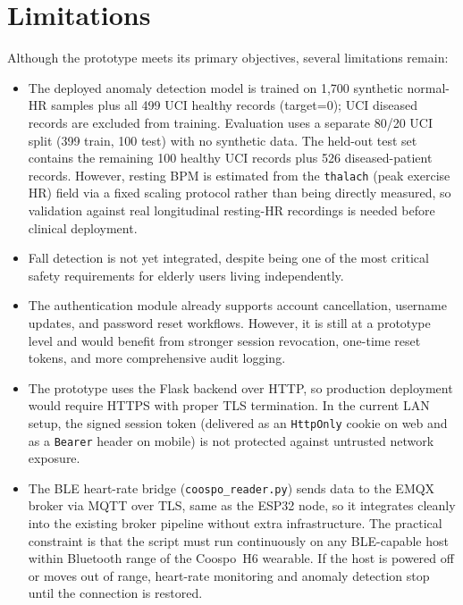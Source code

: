 \section{Limitations}
\label{sec:limitations_conclusion}

Although the prototype meets its primary objectives, several limitations
remain:

\begin{itemize}
    \item The deployed anomaly detection model is trained on 1,700 synthetic normal-HR samples plus all 499 UCI healthy records (target=0); UCI diseased records are excluded from training. Evaluation uses a separate 80/20 UCI split (399 train, 100 test) with no synthetic data. The held-out test set contains the remaining 100 healthy UCI records plus 526 diseased-patient records. However, resting BPM is estimated from the \texttt{thalach} (peak exercise HR) field via a fixed scaling protocol rather than being directly measured, so validation against real longitudinal resting-HR recordings is needed before clinical deployment.

    \item Fall detection is not yet integrated, despite being one of the most critical safety requirements for elderly users living independently.

    \item The authentication module already supports account cancellation, username updates, and password reset workflows. However, it is still at a prototype level and would benefit from stronger session revocation, one-time reset tokens, and more comprehensive audit logging.

    \item The prototype uses the Flask backend over HTTP, so production deployment would require HTTPS with proper TLS termination. In the current LAN setup, the signed session token (delivered as an \texttt{HttpOnly} cookie on web and as a \texttt{Bearer} header on mobile) is not protected against untrusted network exposure.

    \item The BLE heart-rate bridge (\texttt{coospo\_reader.py}) sends data to the EMQX broker via MQTT over TLS, same as the ESP32 node, so it integrates cleanly into the existing broker pipeline without extra infrastructure. The practical constraint is that the script must run continuously on any BLE-capable host within Bluetooth range of the Coospo~H6 wearable. If the host is powered off or moves out of range, heart-rate monitoring and anomaly detection stop until the connection is restored.


\end{itemize}
